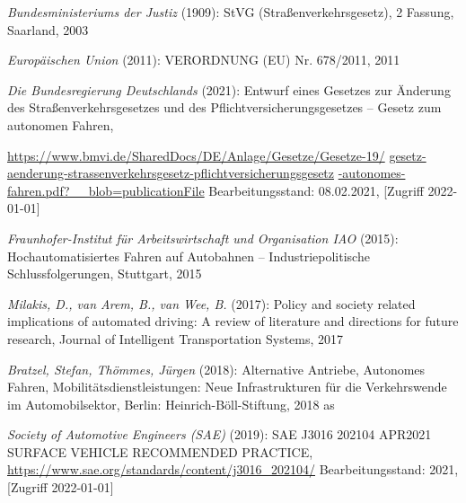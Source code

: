\begin{thebibliography}{9}
	\textit{Bundesministeriums der Justiz} (1909): StVG (Straßenverkehrsgesetz), 2 Fassung, Saarland, 2003

	\textit{Europäischen Union} (2011): VERORDNUNG (EU) Nr. 678/2011, 2011

	\textit{Die Bundesregierung Deutschlands} (2021): Entwurf eines Gesetzes zur Änderung des Straßenverkehrsgesetzes und des Pflichtversicherungsgesetzes – Gesetz zum autonomen Fahren,

	\url{https://www.bmvi.de/SharedDocs/DE/Anlage/Gesetze/Gesetze-19/}
	\url{gesetz-aenderung-strassenverkehrsgesetz-pflichtversicherungsgesetz}
	\url{-autonomes-fahren.pdf?__blob=publicationFile} 
	\newline
	  Bearbeitungsstand: 08.02.2021,
[Zugriff 2022-01-01]

\textit{Fraunhofer-Institut für Arbeitswirtschaft und Organisation IAO} (2015):
Hochautomatisiertes Fahren auf Autobahnen – Industriepolitische Schlussfolgerungen, Stuttgart, 2015

\textit{Milakis, D., van Arem, B., van Wee, B.} (2017):
Policy and society related implications of
	automated driving: A review of literature and directions for future research, Journal of
	Intelligent Transportation Systems, 2017



	\textit{Bratzel, Stefan, Thömmes, Jürgen} (2018):
	Alternative Antriebe, Autonomes Fahren, Mobilitätsdienstleistungen: Neue Infrastrukturen für die Verkehrswende im Automobilsektor,
	Berlin: Heinrich-Böll-Stiftung, 2018
as

	\textit{Society of Automotive Engineers (SAE)} (2019):
	SAE J3016 202104 APR2021 SURFACE VEHICLE
	RECOMMENDED PRACTICE,
	\url{https://www.sae.org/standards/content/j3016_202104/}
	\newline
	Bearbeitungsstand: 2021,
[Zugriff 2022-01-01]
 







\end{thebibliography}